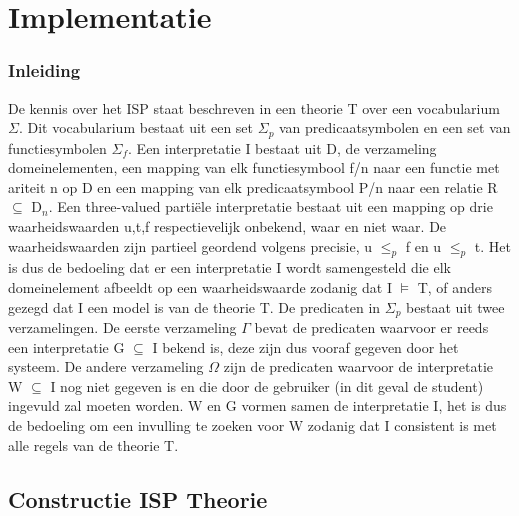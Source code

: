\chapter{Implementatie}
\label{cha:implementatie}

\subsection{Inleiding}
De kennis over het ISP staat beschreven in een theorie T over een vocabularium $\Sigma$. Dit vocabularium bestaat uit een set $\Sigma_{p}$ van predicaatsymbolen en een set van functiesymbolen $\Sigma_{f}$. Een interpretatie I bestaat uit D, de verzameling domeinelementen, een mapping van elk functiesymbool f/n naar een functie met ariteit n op D en een mapping van elk predicaatsymbool P/n naar een relatie R $\subseteq$ D$_{n}$. Een three-valued parti\"{e}le interpretatie bestaat uit een mapping op drie waarheidswaarden {u,t,f} respectievelijk onbekend, waar en niet waar. De waarheidswaarden zijn partieel geordend volgens precisie, u $\leq_{p}$ f en u $\leq_{p}$ t. Het is dus de bedoeling dat er een interpretatie I wordt samengesteld die elk domeinelement afbeeldt op een waarheidswaarde zodanig dat I $\models$ T, of anders gezegd dat I een model is van de theorie T. De predicaten in $\Sigma_{p}$ bestaat uit twee verzamelingen. De eerste verzameling $\Gamma$ bevat de predicaten waarvoor er reeds een interpretatie G $\subseteq$ I bekend is, deze zijn dus vooraf gegeven door het systeem. De andere verzameling $\Omega$ zijn de predicaten waarvoor de interpretatie W $\subseteq$ I nog niet gegeven is en die door de gebruiker (in dit geval de student) ingevuld zal moeten worden. W en G vormen samen de interpretatie I, het is dus de bedoeling om een invulling te zoeken voor W zodanig dat I consistent is met alle regels van de theorie T.

\section{Constructie ISP Theorie}

